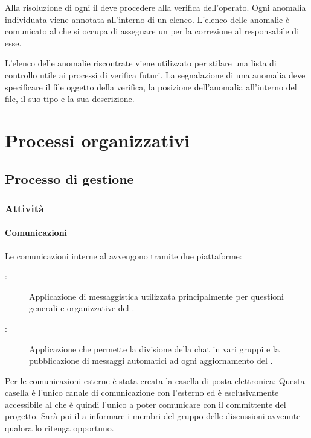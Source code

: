 \documentclass[a4paper, titlepage]{article}
\begin{document}
Alla risoluzione di ogni  il  deve procedere alla verifica dell'operato. Ogni anomalia individuata viene annotata all'interno di un elenco. L'elenco delle anomalie è comunicato al  che si occupa di assegnare un  per la correzione al responsabile di esse.

L'elenco delle anomalie riscontrate viene utilizzato per stilare una lista di controllo utile ai processi di verifica futuri. La segnalazione di una anomalia deve specificare il file oggetto della verifica, la posizione dell'anomalia all'interno del file, il suo tipo e la sua descrizione.


\newpage

\section{Processi organizzativi}

\subsection{Processo di gestione}

\subsubsection{Attività}

\paragraph{Comunicazioni}

Le comunicazioni interne al  avvengono tramite due piattaforme:
\begin{description}
	\item[:] Applicazione di messaggistica utilizzata principalmente per questioni generali e organizzative del .
	\item[:] Applicazione che permette la divisione della chat in vari gruppi e la pubblicazione di messaggi automatici ad ogni aggiornamento del .
\end{description}

Per le comunicazioni esterne è stata creata la casella di posta elettronica:  Questa casella è l'unico canale di comunicazione con l'esterno ed è esclusivamente accessibile al  che è quindi l'unico a poter comunicare con il committente del progetto. Sarà poi il  a informare i membri del gruppo delle discussioni avvenute qualora lo ritenga opportuno.
\end{document}
